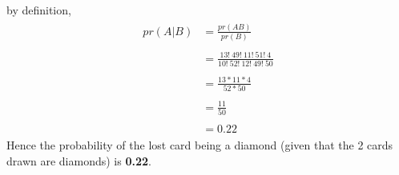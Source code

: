 \documentclass[journal,12pt,twocolumn]{IEEEtran}
\begin{document}
by definition,
\begin{align}
\begin{split}
    pr(A \vert B)&=\frac{pr(AB)}{pr(B)}\\\\
                 &=\frac{13!\:49!\:11!\:51!\:4}{10!\:52!\:12!\:49!\:50}\\\\
                 &=\frac{13*11*4}{52*50}\\\\
                 &=\frac{11}{50}\\\\
                 &=0.22
\end{split}
\end{align}
Hence the probability of the lost card being a diamond (given that the 2 cards drawn are diamonds) is \textbf{0.22}.
\end{document}
